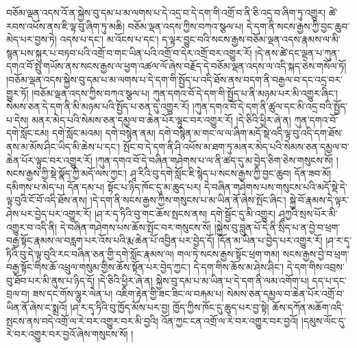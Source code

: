 བཅོམ་ལྡན་འདས་འོ་ན་སྐྱེས་བུ་དམ་པ་མ་ལགས་པ་དེ་འདྲ་བ་དེ་དག་གི་འགྲོ་བ་ནི་ཅི་འདྲ་བ་ཞིག་ཏུ་འགྱུར། ཚེ་རབས་འཕོས་ནས་ཇི་ལྟ་བུ་ཞིག་ཏུ་མཆི། བཅོམ་ལྡན་འདས་ཀྱིས་བཀའ་སྩལ་པ། དེ་དག་ནི་སངས་རྒྱས་ཀྱི་བྱང་ཆུབ་མེད་པར་བྱས་ཏེ། འདས་པ་དང་། མ་འོངས་པ་དང་། ད་ལྟར་བྱུང་བའི་སངས་རྒྱས་བཅོམ་ལྡན་འདས་རྣམས་ལ་མི་སྙན་པས་སྐུར་པ་བཏབ་པའི་འགྲོ་བ་གང་ཡིན་པའི་འགྲོ་བ་དེར་འགྲོ་བར་འགྱུར་རོ། །དེ་ནས་ཚེ་དང་ལྡན་པ་ཀུན་དགའ་བོ་སྤུ་གཡོས་ནས་སངས་རྒྱས་ལ་ཕྱག་འཚལ་ལོ་ཞེས་བརྗོད་དེ་བཅོམ་ལྡན་འདས་ལ་འདི་སྐད་ཅེས་གསོལ་ཏོ། །བཅོམ་ལྡན་འདས་སྐྱེས་བུ་དམ་པ་མ་ལགས་པ་དེ་དག་གི་སྤྱོད་པ་འདི་ཐོས་ནས་བདག་ནི་བརྒྱལ་བ་དང་འདྲ་བར་གྱུར་ཏོ། །བཅོམ་ལྡན་འདས་ཀྱིས་བཀའ་སྩལ་པ། ཀུན་དགའ་བོ་དེ་དག་གི་སྤྱོད་པ་ནི་མཉམ་པར་མི་འགྱུར་ཞིང་། སེམས་ཅན་དེ་དག་ནི་མི་མཉམ་པའི་སྤྱོད་པ་ཅན་དུ་འགྱུར་རོ། །ཀུན་དགའ་བོ་དེ་དག་ནི་ཚུལ་དང་མི་འདྲ་བའི་སྤྱོད་པ་དེས། མནར་མེད་པའི་སེམས་ཅན་དམྱལ་བ་ཆེན་པོར་ལྟུང་བར་འགྱུར་རོ། །དེ་ཅིའི་ཕྱིར་ཞེ་ན། ཀུན་དགའ་བོ་དགེ་སློང་ངམ། དགེ་སློང་མའམ། དགེ་བསྙེན་ནམ། དགེ་བསྙེན་མ་གང་ལ་ལ་ཞིག་མདོ་སྡེ་འདི་ལྟ་བུ་འདི་དག་ཐོས་ནས་མ་མོས་ཤིང་ཡིད་མི་ཆེས་པ་དང་། སྤོང་བ་དེ་དག་ནི་ཤི་འཕོས་མ་ཐག་ཏུ་མནར་མེད་པའི་སེམས་ཅན་དམྱལ་བ་ཆེན་པོར་ལྟུང་བར་འགྱུར་རོ། །ཀུན་དགའ་བོ་དེ་བཞིན་གཤེགས་པ་ལ་ནི་ཚད་དུ་མ་བྱེད་ཅིག་ཅེས་གསུངས་སོ། །སངས་རྒྱས་ཀྱི་སྡེ་སྣོད་ཀྱི་མདོ་ལས་ཀྱང་། ཤཱ་རིའི་བུ་དགེ་སློང་ཇི་སྙེད་པ་སངས་རྒྱས་ཀྱི་བྱང་ཆུབ། དོན་ཟབ་མོ། དམིགས་པ་མེད་པ། དོན་དམ་པ། སྟོང་པ་ཉིད་ཁོང་དུ་མ་ཆུད་པར། དེ་བཞིན་གཤེགས་པས་གསུངས་པའི་མདོ་སྡེ་དེ་ལྟ་བུའི་ངོ་བོ་འདི་ཐོས་ནས། །དེ་དག་ནི་སངས་རྒྱས་ཀྱིས་གསུངས་པ་མ་ཡིན་ནོ་ཞེས་སྤོང་ཞིང་། སྐྱེ་བོ་རྣམས་དེ་ལྟར་ཤེས་པར་བྱེད་པར་འགྱུར་རོ། །ཤ་ར་དྭ་ཏིའི་བུ་གང་ཆོས་སྤངས་ནས། དགེ་སྦྱོང་དུ་མི་འགྱུར། ཤཱཀྱའི་སྲས་པོར་མི་འགྱུར་བ་འདི་ནི། དེ་བཞིན་གཤེགས་པས་ཆོས་སྤོང་བར་གསུངས་སོ། །སྐྱེས་བུ་བླུན་པོ་དེ་ནི་སྲིད་པ་ན་བྱེ་བ་ཕྲག་བརྒྱ་སྟོང་རྣམས་ལ་བརླག་པར་འོས་པའི་རྨ་ཆེན་པོ་འབྱིན་པར་བྱེད་དོ། །དོན་མ་ཡིན་པ་བྱེད་པར་འགྱུར་རོ། །ཤ་ར་དྭ་ཏིའི་བུ་དེ་ལྟ་བུའི་རང་བཞིན་ཅན་གྱི་དགེ་སློང་རྣམས་ལ། གལ་ཏེ་སངས་རྒྱས་སྟོང་ཕྲག་གམ། སངས་རྒྱས་བྱེ་བ་ཕྲག་བརྒྱ་སྟོང་གིས་ཆོ་འཕྲུལ་གསུམ་གྱིས་ཆོས་སྟོན་པར་བྱེད་ཀྱང་། དེ་དག་གིས་ཆོས་མ་ཤེས་ཤིང་། དེ་དག་གིས་འབྲས་བུ་ཐོབ་པར་མི་ནུས་པ་ཉིད་དོ། །དེ་ཅིའི་ཕྱིར་ཞེ་ན། སྐྱེས་བུ་དམ་པ་མ་ཡིན་པ་དེ་དག་ནི་ལམ་འགོག་པ། དད་པ་དང་བྲལ་བ། ཟས་དང་གོས་ལྷུར་ལེན་པ། འཇིག་རྟེན་གྱི་ཟང་ཟིང་ལ་བརྐམ་པ། སེམས་ཅན་དམྱལ་བ་ཆེན་པོར་འགྲོ་བ་ཡིན་ནོ་ཞེས་ང་སྨྲའོ། །ཤ་ར་དྭ་ཏིའི་བུ་ཁྱོད་མོས་པར་བྱ། ཁྱོད་ཀྱིས་ཁོང་དུ་ཆུད་པར་བྱ་སྟེ། ཆོས་དཀོན་མཆོག་འདི་སྤངས་ནས་བདེ་འགྲོ་ལ་རེ་བར་འགྱུར་བར་མི་བྱའི། འོན་ཀྱང་ངན་འགྲོ་ལ་རེ་བར་འགྱུར་བར་བྱའོ། །དམུས་ལོང་དུ་རེ་བར་འགྱུར་བར་བྱའོ་ཞེས་གསུངས་སོ། །
